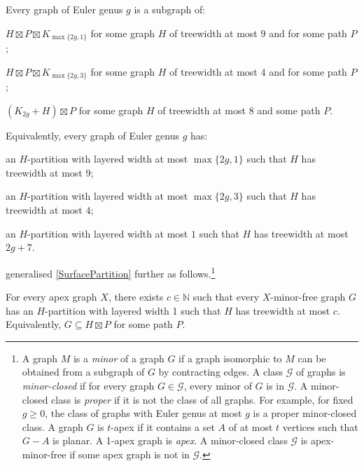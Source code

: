 \documentclass{patmorin}
\renewcommand{\geq}{\geqslant}
\begin{document}
\begin{thm}
\label{SurfacePartition}
Every graph of Euler genus $g$ is a subgraph of:
\begin{compactenum}[(a)]
\item  $H \boxtimes P \boxtimes K_{\max\{2g,1\}}$ for some graph $H$ of treewidth at most $9$ and for some path $P$;
\item  $H \boxtimes P \boxtimes K_{\max\{2g,3\}}$ for some graph $H$ of treewidth at most $4$ and for some path $P$;
\item $(K_{2g} + H )  \boxtimes P$ for some graph $H$ of treewidth at most $8$  and some path $P$. 
\end{compactenum}
Equivalently, every graph of Euler genus $g$ has:
\begin{compactenum}[(a)]
\item an $H$-partition with layered width at most $\max\{2g,1\}$ such that $H$ has treewidth at most $9$;
\item an $H$-partition with layered width at most $\max\{2g,3\}$ such that $H$ has treewidth at most $4$; 
\item an $H$-partition with layered width at most $1$ such that $H$ has treewidth at most $2g+7$. 
\end{compactenum}
\end{thm}

\citet{dujmovic.joret.ea:planar} generalised \cref{SurfacePartition} further as follows.\footnote{A graph $M$ is a \textit{minor} of a graph $G$ if a graph isomorphic to $M$ can be obtained from a subgraph of $G$ by contracting edges. A class $\mathcal{G}$ of graphs is \emph{minor-closed} if for every graph $G\in\mathcal{G}$, every minor of $G$ is in $\mathcal{G}$. A minor-closed class is \emph{proper} if it is not the class of all graphs. For example, for fixed $g\geq 0$, the class of graphs with Euler genus at most $g$ is a proper minor-closed class. A graph $G$ is $t$-apex if it contains a set $A$ of at most $t$ vertices such that $G-A$ is planar. A 1-apex graph is \emph{apex}.  A minor-closed class $\mathcal{G}$ is apex-minor-free if some apex graph is not in $\mathcal{G}$.}

\begin{thm} 
\label{ApexMinorFree}
For every apex graph $X$, there exists $c\in\mathbb{N}$ such that every $X$-minor-free graph $G$ has
an $H$-partition with layered width 1 such that $H$ has treewidth at most $c$. Equivalently, $G\subseteq H\boxtimes P$ for some path $P$. 
\end{thm}
\end{document}
